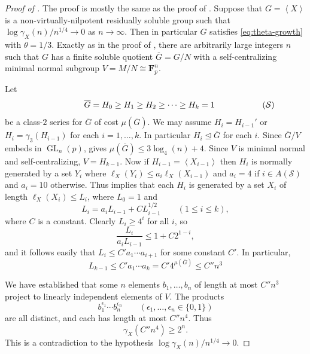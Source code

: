 \documentclass[11pt,reqno]{amsart}
\numberwithin{equation}{section}
\theoremstyle{definition}
\theoremstyle{remark}
\def\F{\mathbf{F}}
\newcommand\opr[1]{\operatorname{#1}}
\def\GL{\opr{GL}}
\def\nsgp{\trianglelefteq}
\newcommand\gen[1]{\left\langle#1\right\rangle}
\renewcommand\bar{\overline}
\numberwithin{equation}{section}
\begin{document}
\begin{proof}[Proof of ]
    The proof is mostly the same as the proof of .
    Suppose that $G = \gen X$ is a non-virtually-nilpotent residually soluble group such that $\log \gamma_X(n) / n^{1/4} \to 0$ as $n \to \infty$.
    Then in particular $G$ satisfies \eqref{eq:theta-growth} with $\theta = 1/3$.
    Exactly as in the proof of , there are arbitrarily large integers $n$ such that $G$ has a finite soluble quotient $\bar G = G / N$ with a self-centralizing minimal normal subgroup $V = M / N \cong \F_p^n$.

    Let
    \begin{equation*}
    \hspace{2 cm}\overline{G}=H_0 \ge H_1 \ge H_2 \ge \dots \ge H_k=1 \hspace{2 cm} (\mathcal{S})
\end{equation*}
    be a class-$2$ series for $\bar G$ of cost $\mu(\bar G)$.
    We may assume $H_i = H_{i-1}'$ or $H_i = \gamma_3(H_{i-1})$ for each $i = 1, \dots, k$.
    In particular $H_i \nsgp \bar G$ for each $i$.
    Since $\bar G / V$ embeds in $\GL_n(p)$,  gives $\mu(\bar G) \le 3 \log_4(n) + 4$.
    Since $V$ is minimal normal and self-centralizing, $V = H_{k-1}$.
    Now if $H_{i-1} = \gen{X_{i-1}}$ then $H_i$ is normally generated by a set $Y_i$ where $\ell_X(Y_i) \le a_i \ell_X(X_{i-1})$ and $a_i = 4$ if $i \in A(\mathcal S)$ and $a_i = 10$ otherwise.
    Thus  implies that each $H_i$ is generated by a set $X_i$ of length $\ell_X(X_i) \le L_i$, where $L_0 = 1$ and
    \[
        L_i = a_i L_{i-1} + C L_{i-1}^{1/2} \qquad(1 \le i \le k),
    \]
    where $C$ is a constant.
    Clearly $L_i \ge 4^i$ for all $i$, so
    \[
        \frac{L_i}{a_i L_{i-1}} \le 1 + C 2^{1-i},
    \]
    and it follows easily that
    \(
        L_i \le C' a_1 \cdots a_{i+1}
    \)
    for some constant $C'$.
    In particular,
    \[
        L_{k-1} \le C' a_1 \cdots a_k = C' 4^{\mu(\bar G)} \le C'' n^3
    \]

    We have established that some $n$ elements $b_1, \dots, b_n$ of length at most $C'' n^3$ project to linearly independent elements of $V$. The products
    \[
        b_1^{\epsilon_1} \cdots b_n^{\epsilon_n} \qquad (\epsilon_1, \dots, \epsilon_n \in \{0,1\})
    \]
    are all distinct, and each has length at most $C'' n^4$.
    Thus
    \[
        \gamma_X( C'' n^4 ) \ge 2^n.
    \]
    This is a contradiction to the hypothesis $\log \gamma_X(n) / n^{1/4} \to 0$.
\end{proof}
\end{document}
